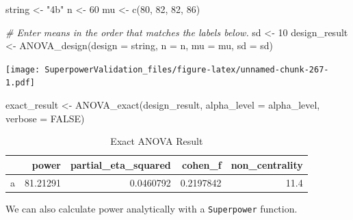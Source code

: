 \documentclass[
]{book}
\newenvironment{Shaded}{\begin{snugshade}}{\end{snugshade}}
\newcommand{\AttributeTok}[1]{\textcolor[rgb]{0.77,0.63,0.00}{#1}}
\newcommand{\CommentTok}[1]{\textcolor[rgb]{0.56,0.35,0.01}{\textit{#1}}}
\newcommand{\ConstantTok}[1]{\textcolor[rgb]{0.00,0.00,0.00}{#1}}
\newcommand{\DecValTok}[1]{\textcolor[rgb]{0.00,0.00,0.81}{#1}}
\newcommand{\FunctionTok}[1]{\textcolor[rgb]{0.00,0.00,0.00}{#1}}
\newcommand{\NormalTok}[1]{#1}
\newcommand{\OtherTok}[1]{\textcolor[rgb]{0.56,0.35,0.01}{#1}}
\newcommand{\SpecialCharTok}[1]{\textcolor[rgb]{0.00,0.00,0.00}{#1}}
\newcommand{\StringTok}[1]{\textcolor[rgb]{0.31,0.60,0.02}{#1}}
\begin{document}
\begin{Shaded}
\begin{Highlighting}[]
\NormalTok{string }\OtherTok{\textless{}{-}} \StringTok{"4b"}
\NormalTok{n }\OtherTok{\textless{}{-}} \DecValTok{60}
\NormalTok{mu }\OtherTok{\textless{}{-}} \FunctionTok{c}\NormalTok{(}\DecValTok{80}\NormalTok{, }\DecValTok{82}\NormalTok{, }\DecValTok{82}\NormalTok{, }\DecValTok{86}\NormalTok{) }

\CommentTok{\# Enter means in the order that matches the labels below.}
\NormalTok{sd }\OtherTok{\textless{}{-}} \DecValTok{10}
\NormalTok{design\_result }\OtherTok{\textless{}{-}} \FunctionTok{ANOVA\_design}\NormalTok{(}\AttributeTok{design =}\NormalTok{ string,}
                   \AttributeTok{n =}\NormalTok{ n, }
                   \AttributeTok{mu =}\NormalTok{ mu, }
                   \AttributeTok{sd =}\NormalTok{ sd)}
\end{Highlighting}
\end{Shaded}

\texttt{[image: SuperpowerValidation\_files/figure-latex/unnamed-chunk-267-1.pdf]}

\begin{Shaded}
\begin{Highlighting}[]
\NormalTok{exact\_result }\OtherTok{\textless{}{-}} \FunctionTok{ANOVA\_exact}\NormalTok{(design\_result,}
                            \AttributeTok{alpha\_level =}\NormalTok{ alpha\_level,}
                            \AttributeTok{verbose =} \ConstantTok{FALSE}\NormalTok{)}
\end{Highlighting}
\end{Shaded}

\begin{table}[!h]

\caption{\label{tab:unnamed-chunk-268}Exact ANOVA Result}
\centering
\begin{tabular}[t]{l|r|r|r|r}
\hline
  & power & partial\_eta\_squared & cohen\_f & non\_centrality\\
\hline
a & 81.21291 & 0.0460792 & 0.2197842 & 11.4\\
\hline
\end{tabular}
\end{table}

We can also calculate power analytically with a \texttt{Superpower} function.

\begin{Shaded}
\end{Shaded}
\end{document}
